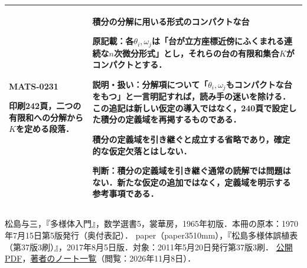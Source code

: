 \documentclass[a4paper,10pt]{ltjsarticle}
\begin{document}
\begin{longtable}{@{}>{\raggedright\arraybackslash}p{.19\linewidth}>{\raggedright\arraybackslash}p{.77\linewidth}@{}}
\hypertarget{MATS-0231}{}\textbf{MATS-0231}\par 印刷242頁，二つの有限和への分解から$K$を定める段落． & \textbf{積分の分解に用いる形式のコンパクトな台}\par\textbf{原記載：}各$\theta_i,\omega_j$は「台が立方座標近傍にふくまれる連続な$n$次微分形式」とし，それらの台の有限和集合$K$がコンパクトとする．\par\textbf{説明・扱い：}分解項について「$\theta_i,\omega_j$もコンパクトな台をもつ」と一言明記すれば，読み手の迷いを除ける．この追記は新しい仮定の導入ではなく，240頁で設定した積分の定義域を再掲するものである．\par 積分の定義域を引き継ぐと成立する省略であり，確定的な仮定欠落とはしない．\par\textbf{判断：}積分の定義域を引き継ぐ通常の読解では問題はない．新たな仮定の追加ではなく，定義域を明示する参考事項である． \\[3pt]
\hline
\end{longtable}
\normalsize
\clearpage
\begin{thebibliography}{9}
松島与三，『多様体入門』，数学選書5，裳華房，1965年初版．本冊の原本：1970年7月15日第5版発行（奥付表記）．
paper（paper3510mm），『松島多様体誤植表（第37版3刷）』，2017年8月5日版．対象：2011年5月20日発行第37版3刷．
\href{https://s2s.undefin.net/wiki/?file=matsushima_errors.pdf&pcmd=open&plugin=attach&refer=2016%2F%E8%87%AA%E4%B8%BB%E3%82%BC%E3%83%9F%2F%E6%9D%BE%E5%B3%B6%E5%A4%9A%E6%A7%98%E4%BD%93}{公開PDF}，\href{https://paper3510mm.github.io/notes}{著者のノート一覧}（閲覧：2026年11月8日）．
\end{thebibliography}
\end{document}
